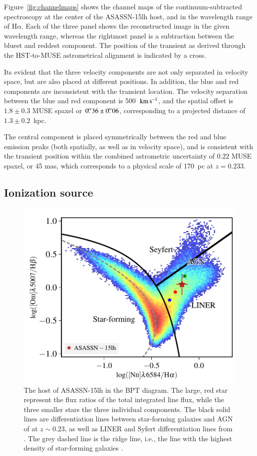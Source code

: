 \documentclass[traditabstract]{aa}
\newcommand{\farc}{\hbox{$.\!\!^{\prime\prime}$}}
\newcommand{\kms}{$\rm{km\,s^{-1}}$}
\newcommand{\ha}{H$\alpha$}
\begin{document}
Figure~\ref{fig:channelmaps} shows the channel maps of the continuum-subtracted spectroscopy at the center of the ASASSN-15lh host, and in the wavelength range of \ha. Each of the three panel shows the reconstructed image in the given wavelength range, whereas the rightmost panel is a subtraction between the bluest and reddest component. The position of the transient as derived through the HST-to-MUSE astrometrical alignment is indicated by a cross.

Its evident that the three velocity components are not only separated in velocity space, but are also placed at different positions. In addition, the blue and red components are inconsistent with the transient location. The velocity separation between the blue and red component is 500~\kms, and the spatial offset is $1.8\pm0.3$ MUSE spaxel or $0\farc{36}\pm0\farc{06}$, corresponding to a projected distance of $1.3\pm0.2$~kpc.

The central component is placed symmetrically between the red and blue emission peaks (both spatially, as well as in velocity space), and is consistent with the transient position within the combined astrometric uncertainty of $0.22$ MUSE spaxel, or 45 mas, which corresponds to a physical scale of 170~pc at $z=0.233$.

\subsection{Ionization source}
\label{sec:ionsource}

\begin{figure}
  \includegraphics[width=0.999\linewidth]{fig/BPT.pdf}
\caption{The host of ASASSN-15lh in the BPT diagram. The large, red star represent the flux ratios of the total integrated line flux, while the three smaller stars the three individual components. The black solid lines are differentiation lines between star-forming galaxies and AGN of \citet{2013ApJ...774L..10K} at $z\sim0.23$, as well as LINER and Syfert differentiation lines from \citet{2010MNRAS.403.1036C}. The grey dashed line is the ridge line, i.e., the line with the highest density of star-forming galaxies \citep{2008MNRAS.385..769B}.}
\label{fig:BPT}
\end{figure}
\end{document}
